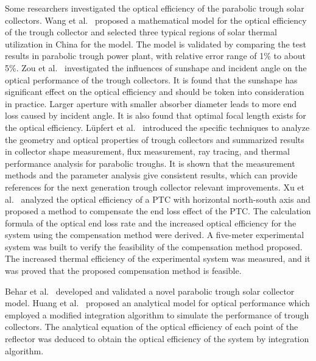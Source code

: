 
Some researchers investigated the optical efficiency of the parabolic trough solar collectors.
Wang et al.~\cite{Wang2016} proposed a mathematical model for the optical efficiency of the trough collector and selected three typical regions of solar thermal utilization in China for the model. The model is validated by comparing the test results in parabolic trough power plant, with relative error range of 1\% to about 5\%.
Zou et al.~\cite{Zou2017} investigated the influences of sunshape and incident angle on the optical performance of the trough collectors. It is found that the sunshape has significant effect on the optical efficiency and should be token into consideration in practice. Larger aperture with smaller absorber diameter leads to more end loss caused by incident angle. It is also found that optimal focal length exists for the optical efficiency.
L\"upfert et al.~\cite{Lupfert2006} introduced the specific techniques to analyze the geometry and optical properties of trough collectors and summarized results in collector shape measurement, flux measurement, ray tracing, and thermal performance analysis for parabolic troughs. It is shown that the measurement methods and the parameter analysis give consistent results, which can provide references for the next generation trough collector relevant improvements.
Xu et al.~\cite{Xu2014} analyzed the optical efficiency of a PTC with horizontal north-south axis and proposed a method to compensate the end loss effect of the PTC. The calculation formula of the optical end loss rate and the increased optical efficiency for the system using the compensation method were derived. A five-meter experimental system was built to verify the feasibility of the compensation method proposed. The increased thermal efficiency of the experimental system was measured, and it was proved that the proposed compensation method is feasible.

Behar et al.~\cite{Behar2015} developed and validated a novel parabolic trough solar collector model. 
Huang et al.~\cite{Huang2012} proposed an analytical model for optical performance which employed a modified integration algorithm to simulate the performance of trough collectors. The analytical equation of the optical efficiency of each point of the reflector was deduced to obtain the optical efficiency of the system by integration algorithm.

